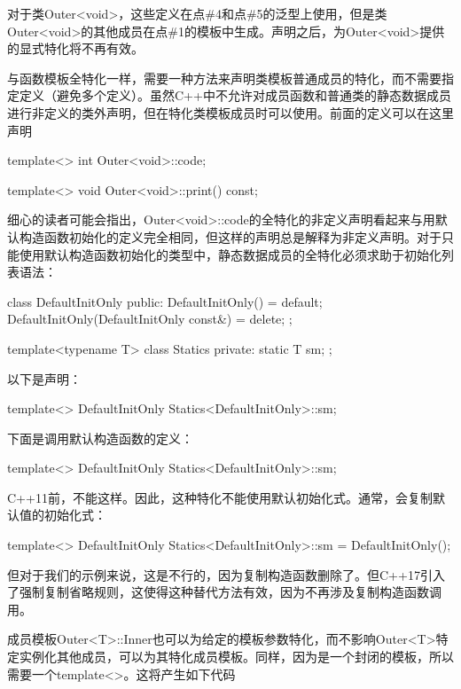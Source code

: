 对于类Outer<void>，这些定义在点\#4和点\#5的泛型上使用，但是类Outer<void>的其他成员在点\#1的模板中生成。声明之后，为Outer<void>提供的显式特化将不再有效。

与函数模板全特化一样，需要一种方法来声明类模板普通成员的特化，而不需要指定定义（避免多个定义）。虽然C++中不允许对成员函数和普通类的静态数据成员进行非定义的类外声明，但在特化类模板成员时可以使用。前面的定义可以在这里声明

\begin{cpp}
template<>
int Outer<void>::code;

template<>
void Outer<void>::print() const;
\end{cpp}

细心的读者可能会指出，Outer<void>::code的全特化的非定义声明看起来与用默认构造函数初始化的定义完全相同，但这样的声明总是解释为非定义声明。对于只能使用默认构造函数初始化的类型中，静态数据成员的全特化必须求助于初始化列表语法：

\begin{cpp}
class DefaultInitOnly {
	public:
	DefaultInitOnly() = default;
	DefaultInitOnly(DefaultInitOnly const&) = delete;
};

template<typename T>
class Statics {
	private:
	static T sm;
};
\end{cpp}

以下是声明：

\begin{cpp}
template<>
DefaultInitOnly Statics<DefaultInitOnly>::sm;
\end{cpp}

下面是调用默认构造函数的定义：

\begin{cpp}
template<>
DefaultInitOnly Statics<DefaultInitOnly>::sm{};
\end{cpp}

C++11前，不能这样。因此，这种特化不能使用默认初始化式。通常，会复制默认值的初始化式：

\begin{cpp}
template<>
DefaultInitOnly Statics<DefaultInitOnly>::sm = DefaultInitOnly();
\end{cpp}

但对于我们的示例来说，这是不行的，因为复制构造函数删除了。但C++17引入了强制复制省略规则，这使得这种替代方法有效，因为不再涉及复制构造函数调用。

成员模板Outer<T>::Inner也可以为给定的模板参数特化，而不影响Outer<T>特定实例化其他成员，可以为其特化成员模板。同样，因为是一个封闭的模板，所以需要一个template<>。这将产生如下代码

